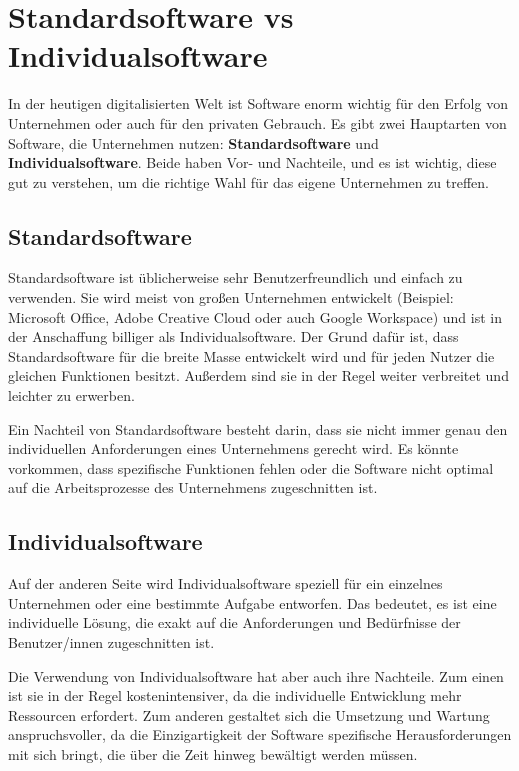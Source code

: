 \section {Standardsoftware vs Individualsoftware}

In der heutigen digitalisierten Welt ist Software enorm wichtig für den Erfolg von Unternehmen 
oder auch für den privaten Gebrauch.
Es gibt zwei Hauptarten von Software, die Unternehmen nutzen: \textbf{Standardsoftware} und 
\textbf{Individualsoftware}.
Beide haben Vor- und Nachteile, und es ist wichtig, 
diese gut zu verstehen, um die richtige Wahl für das eigene Unternehmen zu treffen.

\subsection*{Standardsoftware}

Standardsoftware ist üblicherweise sehr Benutzerfreundlich und einfach zu verwenden. 
Sie wird meist von großen Unternehmen entwickelt 
(Beispiel: Microsoft Office, Adobe Creative Cloud oder auch Google Workspace) 
und ist in der Anschaffung billiger als Individualsoftware. 
Der Grund dafür ist, dass Standardsoftware für die breite Masse entwickelt wird 
und für jeden Nutzer die gleichen Funktionen besitzt. 
Außerdem sind sie in der Regel weiter verbreitet und leichter zu erwerben.

Ein Nachteil von Standardsoftware besteht darin, dass sie nicht immer genau 
den individuellen Anforderungen eines Unternehmens gerecht wird. 
Es könnte vorkommen, dass spezifische Funktionen fehlen oder die Software 
nicht optimal auf die Arbeitsprozesse des Unternehmens zugeschnitten ist. 

\subsection*{Individualsoftware}

Auf der anderen Seite wird Individualsoftware speziell für ein einzelnes 
Unternehmen oder eine bestimmte Aufgabe entworfen. 
Das bedeutet, es ist eine individuelle Lösung, die exakt auf 
die Anforderungen und Bedürfnisse der Benutzer/innen zugeschnitten ist.

Die Verwendung von Individualsoftware hat aber auch ihre Nachteile. 
Zum einen ist sie in der Regel kostenintensiver, da die individuelle Entwicklung 
mehr Ressourcen erfordert. Zum anderen gestaltet sich die Umsetzung und Wartung 
anspruchsvoller, da die Einzigartigkeit der Software spezifische Herausforderungen 
mit sich bringt, die über die Zeit hinweg bewältigt werden müssen.

